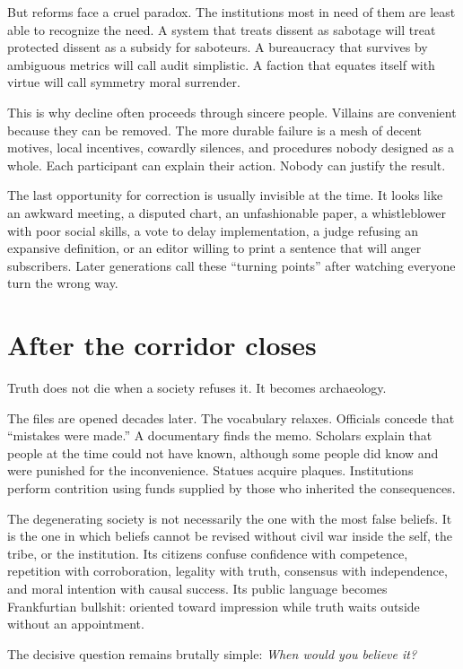 ﻿\documentclass[12pt,a4paper]{book}
\begin{document}
But reforms face a cruel paradox. The institutions most in need of them are least able to recognize the need. A system that treats dissent as sabotage will treat protected dissent as a subsidy for saboteurs. A bureaucracy that survives by ambiguous metrics will call audit simplistic. A faction that equates itself with virtue will call symmetry moral surrender.

This is why decline often proceeds through sincere people. Villains are convenient because they can be removed. The more durable failure is a mesh of decent motives, local incentives, cowardly silences, and procedures nobody designed as a whole. Each participant can explain their action. Nobody can justify the result.

The last opportunity for correction is usually invisible at the time. It looks like an awkward meeting, a disputed chart, an unfashionable paper, a whistleblower with poor social skills, a vote to delay implementation, a judge refusing an expansive definition, or an editor willing to print a sentence that will anger subscribers. Later generations call these “turning points” after watching everyone turn the wrong way.

\section{After the corridor closes}

Truth does not die when a society refuses it. It becomes archaeology.

The files are opened decades later. The vocabulary relaxes. Officials concede that “mistakes were made.” A documentary finds the memo. Scholars explain that people at the time could not have known, although some people did know and were punished for the inconvenience. Statues acquire plaques. Institutions perform contrition using funds supplied by those who inherited the consequences.

The degenerating society is not necessarily the one with the most false beliefs. It is the one in which beliefs cannot be revised without civil war inside the self, the tribe, or the institution. Its citizens confuse confidence with competence, repetition with corroboration, legality with truth, consensus with independence, and moral intention with causal success. Its public language becomes Frankfurtian bullshit: oriented toward impression while truth waits outside without an appointment.

The decisive question remains brutally simple: \emph{When would you believe it?}
\end{document}
